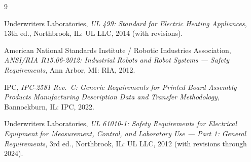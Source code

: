 
\begin{thebibliography}{9}

Underwriters Laboratories,
\textit{UL 499: Standard for Electric Heating Appliances},
13th ed., Northbrook, IL: UL LLC, 2014 (with revisions).


American National Standards Institute / Robotic Industries Association,
\textit{ANSI/RIA R15.06-2012: Industrial Robots and Robot Systems --- Safety Requirements},
Ann Arbor, MI: RIA, 2012.


IPC,
\textit{IPC-2581 Rev.\ C: Generic Requirements for Printed Board Assembly Products Manufacturing Description Data and Transfer Methodology},
Bannockburn, IL: IPC, 2022.


Underwriters Laboratories,
\textit{UL 61010-1: Safety Requirements for Electrical Equipment for Measurement, Control, and Laboratory Use --- Part 1: General Requirements},
3rd ed., Northbrook, IL: UL LLC, 2012 (with revisions through 2024).


\end{thebibliography}
